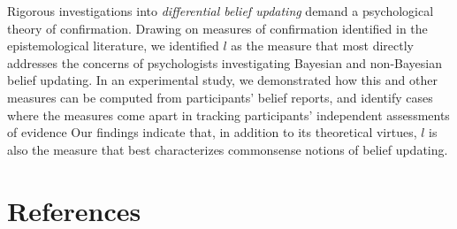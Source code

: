 \documentclass[10pt, letterpaper]{article}
\begin{document}
Rigorous investigations into \emph{differential belief updating} demand
a psychological theory of confirmation. Drawing on measures of
confirmation identified in the epistemological literature, we identified
\(l\) as the measure that most directly addresses the concerns of
psychologists investigating Bayesian and non-Bayesian belief updating.
In an experimental study, we demonstrated how this and other measures
can be computed from participants' belief reports, and identify cases
where the measures come apart in tracking participants' independent
assessments of evidence Our findings indicate that, in addition to its
theoretical virtues, \(l\) is also the measure that best characterizes
commonsense notions of belief updating.

\hypertarget{references}{%
\section{References}\label{references}}

\setlength{\parindent}{-0.1in} 
\setlength{\leftskip}{0.125in}

\noindent
\end{document}
